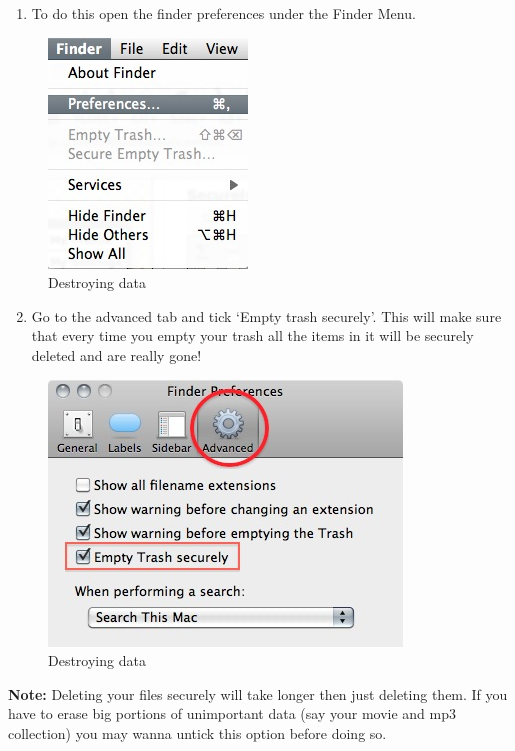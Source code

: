 \begin{enumerate}[1.]
\item
  To do this open the finder preferences under the Finder Menu.
\end{enumerate}
\begin{figure}[htbp]
\centering
\includegraphics{destroy_data_007.jpg}
\caption{Destroying data}
\end{figure}

\begin{enumerate}[1.]
\setcounter{enumi}{1}
\item
  Go to the advanced tab and tick `Empty trash securely'. This will make
  sure that every time you empty your trash all the items in it will be
  securely deleted and are really gone!
\end{enumerate}
\begin{figure}[htbp]
\centering
\includegraphics{destroy_data_008.jpg}
\caption{Destroying data}
\end{figure}

\textbf{Note:} Deleting your files securely will take longer then just
deleting them. If you have to erase big portions of unimportant data
(say your movie and mp3 collection) you may wanna untick this option
before doing so.

